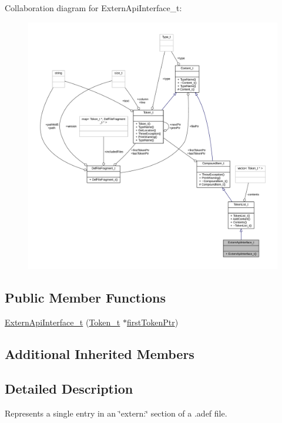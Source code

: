 Collaboration diagram for Extern\+Api\+Interface\+\_\+t\+:
\nopagebreak
\begin{figure}[H]
\begin{center}
\leavevmode
\includegraphics[width=350pt]{struct_extern_api_interface__t__coll__graph}
\end{center}
\end{figure}
\subsection*{Public Member Functions}
\begin{DoxyCompactItemize}
\item 
\hyperlink{struct_extern_api_interface__t_a7debe5b1058119dfed0ecc9cedbcd040}{Extern\+Api\+Interface\+\_\+t} (\hyperlink{struct_token__t}{Token\+\_\+t} $\ast$\hyperlink{struct_compound_item__t_a4d95dc788120f627e332491589d20c5c}{first\+Token\+Ptr})
\end{DoxyCompactItemize}
\subsection*{Additional Inherited Members}


\subsection{Detailed Description}
Represents a single entry in an \char`\"{}extern\+:\char`\"{} section of a .adef file. 

